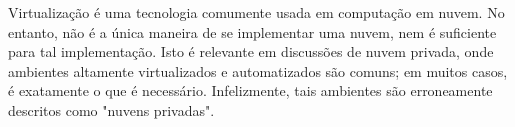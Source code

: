 \begin{enumerate}
		Virtualização é uma tecnologia comumente usada em computação em nuvem. No 
		entanto, não é a única maneira de se implementar uma nuvem, nem é suficiente 
		para tal implementação. Isto é relevante em discussões de nuvem privada, 
		onde ambientes altamente virtualizados e automatizados são comuns; em muitos 
		casos, é exatamente o que é necessário. Infelizmente, tais ambientes são 
		erroneamente descritos como "nuvens privadas".
\end{enumerate}
\undef\itemm
